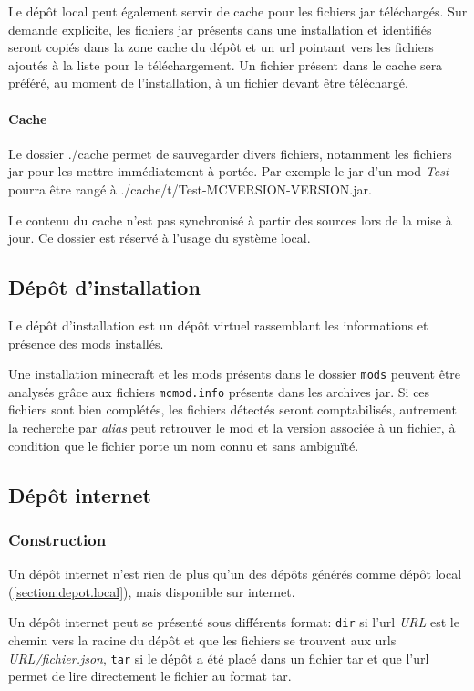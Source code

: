 \documentclass{article}
\begin{document}
Le dépôt local peut également servir de cache pour les fichiers jar téléchargés.
Sur demande explicite, les fichiers jar présents dans une installation et identifiés seront copiés dans la zone cache du dépôt et un url pointant vers les fichiers ajoutés à la liste pour le téléchargement.
Un fichier présent dans le cache sera préféré, au moment de l'installation, à un fichier devant être téléchargé.

\paragraph{Cache}
Le dossier \textsf{./cache} permet de sauvegarder divers fichiers, notamment les fichiers jar pour les mettre immédiatement à portée.
Par exemple le jar d'un mod \textit{Test} pourra être rangé à \textsf{./cache/t/Test-MCVERSION-VERSION.jar}.

Le contenu du cache n'est pas synchronisé à partir des sources lors de la mise à jour.
Ce dossier est réservé à l'usage du système local.

\subsection{Dépôt d'installation}
\label{section:depot.installation}
Le dépôt d'installation est un dépôt virtuel rassemblant les informations et présence des mods installés.

Une installation minecraft et les mods présents dans le dossier \texttt{mods} peuvent être analysés grâce aux fichiers \texttt{mcmod.info} présents dans les archives jar.
Si ces fichiers sont bien complétés, les fichiers détectés seront comptabilisés, autrement la recherche par \textit{alias} peut retrouver le mod et la version associée à un fichier, à condition que le fichier porte un nom connu et sans ambiguïté.

\subsection{Dépôt internet}
\label{section:depot.internet}
\subsubsection{Construction}
Un dépôt internet n'est rien de plus qu'un des dépôts générés comme dépôt local (\ref{section:depot.local}), mais disponible sur internet.

Un dépôt internet peut se présenté sous différents format: \texttt{dir} si l'url \textit{URL} est le chemin vers la racine du dépôt et que les fichiers se trouvent aux urls \textit{URL/fichier.json}, \texttt{tar} si le dépôt a été placé dans un fichier tar et que l'url permet de lire directement le fichier au format tar.
\end{document}
